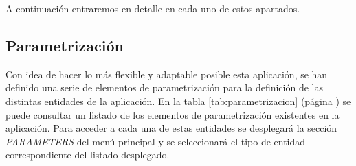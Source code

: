 A continuación entraremos en detalle en cada uno de estos apartados.

\subsection{Parametrización}
\label{sub:parametrizacion}

Con idea de hacer lo más flexible y adaptable posible esta aplicación, se han definido una serie de elementos de parametrización para la definición de las distintas entidades de la aplicación. En la tabla \ref{tab:parametrizacion} (página \pageref{tab:parametrizacion}) se puede consultar un listado de los elementos de parametrización existentes en la aplicación. Para acceder a cada una de estas entidades se desplegará la sección \emph{PARAMETERS} del menú principal y se seleccionará el tipo de entidad correspondiente del listado desplegado.



